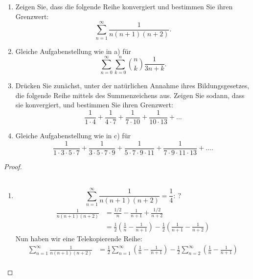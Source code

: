 \documentclass{../problemset}
\begin{document}
\maketitle

\begin{problem}
\\\
\begin{enumerate}
	\item Zeigen Sie, dass die folgende Reihe konvergiert und bestimmen Sie ihren Grenzwert:
	      \[
		      \sum_{n=1}^{\infty} \frac{1}{n(n + 1)(n + 2)}.
	      \]
	\item Gleiche Aufgabenstellung wie in a) für
	      \[
		      \sum_{n=0}^{\infty} \sum_{k=0}^{n} {n \choose k} \frac{1}{3n+k}.
	      \]
	\item Drücken Sie zunächst, unter der natürlichen Annahme ihres Bildungsgesetzes, die folgende Reihe mittels des Summenzeichens aus. Zeigen Sie sodann, dass sie konvergiert, und bestimmen Sie ihren Grenzwert:
	      \[
		      \frac{1}{1 \cdot 4 } + \frac{1}{4 \cdot 7 } + \frac{1}{7 \cdot 10} + \frac{1}{10 \cdot 13} + \ldots
	      \]
	\item Gleiche Aufgabenstellung wie in c) für
	      \[
		      \frac{1}{1 \cdot 3 \cdot 5 \cdot 7 } + \frac{1}{3 \cdot 5 \cdot 7 \cdot 9} + \frac{1}{5 \cdot 7 \cdot 9 \cdot 11} + \frac{1}{7 \cdot 9 \cdot 11 \cdot 13} + \ldots.
	      \]
\end{enumerate}
\begin{proof}
	\\\
	\begin{enumerate}
		\item
		      \[
			      \sum_{n = 1}^{\infty}\frac{1}{n(n + 1)(n + 2)} = \frac{1}{4}:\ ?
		      \]
		      \begin{align}
			      \frac{1}{n(n + 1)(n + 2)} & = \frac{1/2}{n} - \frac{1}{n + 1} + \frac{1/2}{n + 2}                                                               \\
			                                & = \frac{1}{2}\left(\frac{1}{n} - \frac{1}{n + 1}\right) - \frac{1}{2}\left(\frac{1}{n + 1} - \frac{1}{n + 2}\right)
		      \end{align}
		      Nun haben wir eine Telekopierende Reihe:
		      \begin{align}
			      \sum_{n = 1}^{\infty}\frac{1}{n(n + 1)(n + 2)} & = \frac{1}{2}\sum_{n = 1}^{\infty}\left(\frac{1}{n} - \frac{1}{n + 1}\right) - \frac{1}{2}\sum_{n = 2}^{\infty}\left(\frac{1}{n} - \frac{1}{n + 1}\right) \\

\end{align}
\end{enumerate}
\end{proof}
\end{problem}
\end{document}
